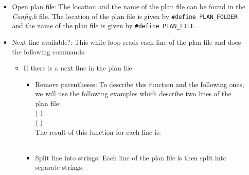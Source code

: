 \begin{itemize}
\item Open plan file: The location and the name of the plan file can be found in the \textit{Config.h} file. The location of the plan file is given by \texttt{\#define PLAN\_FOLDER} and the name of the plan file is given by \texttt{\#define PLAN\_FILE}.
\item Next line available?: This while loop reads each line of the plan file and does the following commands:
\begin{itemize}
\item If there is a next line in the plan file
\begin{itemize}
\item Remove parentheses: To describe this function and the following ones, we will use the following examples which describe two lines of the plan file:\\
    \small{(  )} \\
    \small{(   )}\\
    The result of this function for each line is:\\
    \small{  } \\
    \small{   }
\item Split line into strings: Each line of the plan file is then split into separate strings.


\end{itemize}
\end{itemize}
\end{itemize}
